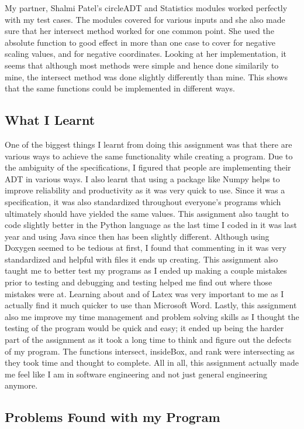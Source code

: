 \documentclass[12pt]{article}
\begin{document}
My partner, Shalmi Patel's circleADT and Statistics modules worked perfectly with my test cases. The modules covered for various inputs and she also made sure that her intersect method worked for one common point. She used the absolute function to good effect in more than one case to cover for negative scaling values, and for negative coordinates. Looking at her implementation, it seems that although most methods were simple and hence done similarily to mine, the intersect method was done slightly differently than mine. This shows that the same functions could be implemented in different ways.

\subsection{What I Learnt}

One of the biggest things I learnt from doing this assignment was that there are various ways to achieve the same functionality while creating a program. Due to the ambiguity of the specifications, I figured that people are implementing their ADT in various ways. I also learnt that using a package like Numpy helps to improve reliability and productivity as it was very quick to use. Since it was a specification, it was also standardized throughout everyone's programs which ultimately should have yielded the same values. This assignment also taught to code slightly better in the Python language as the last time I coded in it was last year and using Java since then has been slightly different. Although using Doxygen seemed to be tedious at first, I found that commenting in it was very standardized and helpful with files it ends up creating. This assignment also taught me to better test my programs as I ended up making a couple mistakes prior to testing and debugging and testing helped me find out where those mistakes were at. Learning about and of Latex was very important to me as I actually find it much quicker to use than Microsoft Word. Lastly, this assignment also me improve my time management and problem solving skills as I thought the testing of the program would be quick and easy; it ended up being the harder part of the assignment as it took a long time to think and figure out the defects of my program. The functions intersect, insideBox, and rank were intersecting as they took time and thought to complete. All in all, this assignment actually made me feel like I am in software engineering and not just general engineering anymore. 

\subsection{Problems Found with my Program}
\end{document}
